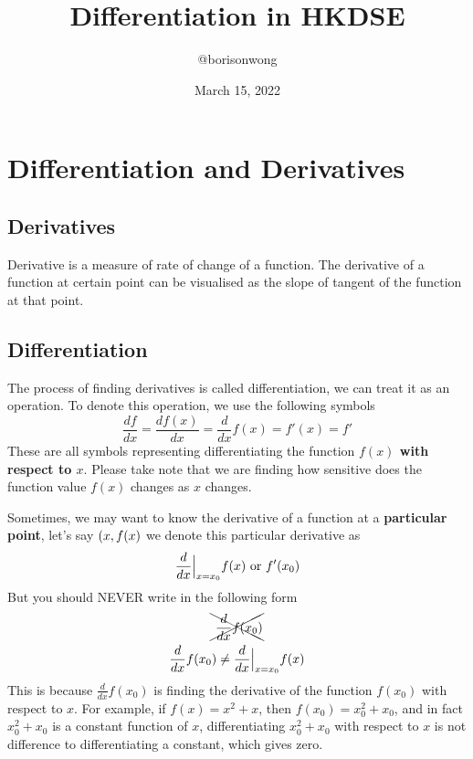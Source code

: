 \documentclass{article}
\title{Differentiation in HKDSE}
\author{@borisonwong}
\date{March 15, 2022}
\begin{document}
\maketitle
\tableofcontents
\pagebreak
\section{Differentiation and Derivatives}
\subsection{Derivatives}
Derivative is a measure of rate of change
of a function. The derivative of a function
at certain point can be visualised as the
slope of tangent of the function at that
point.
\subsection{Differentiation}
The process of finding derivatives is
called differentiation, we can treat it
as an operation. To denote this operation,
we use the following symbols
\begin{equation*}
    \frac{df}{dx} =\frac{df( x)}{dx} =\frac{d}{dx} f( x) =f'( x) =f'
\end{equation*}
These are all symbols representing
differentiating the function
\textbf{$f(x)$ with respect to $x$}. Please take
note that we are finding how sensitive
does the function value $f(x)$ changes as
$x$ changes.


Sometimes, we may want to know the
derivative of a function at a \textbf{particular
point}, let's say $(x\index{0},f(x\index{0})$
we denote this particular derivative as
\begin{equation*}
    \frac{d}{dx}\Bigl|_{x=x_{0}} f( x) \ \text{or} \ f'(x_0)
\end{equation*}
But you should NEVER write in the
following form
\begin{gather*}
    \xcancel{\ \frac{d}{dx} f( x_{0})}\\
    \frac{d}{dx} f( x_{0}) \neq \frac{d}{dx}\Bigl|_{x=x_{0}} f( x)
\end{gather*}
This is because 
$\displaystyle\frac{d}{dx}f(x_0)$ is finding the
derivative of the function
$f(x_0)$ with respect to $x$.
For example, if $\displaystyle f(x)=x^2+x$, 
then $\displaystyle f(x_0)=x_0^2+x_0$, and in fact
$\displaystyle x_0^2+x_0$ is a constant function of $x$,
differentiating $\displaystyle x_0^2+x_0$ with respect
to $x$ is not difference to differentiating
a constant, which gives zero.
\end{document}
